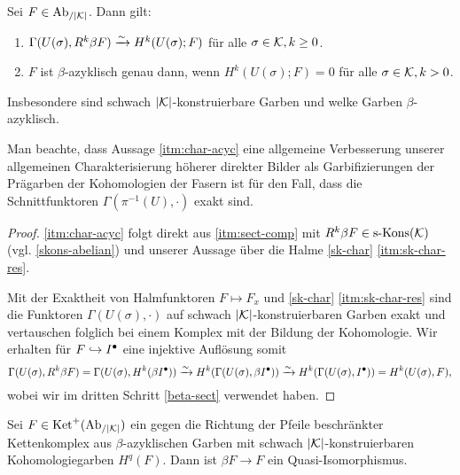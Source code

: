 \begin{prop}[\cite{KS}, 8.1.8] \label{sk-ist-azyk}
  Sei $F \in \operatorname{Ab}_{/|\mathcal{K}|}$. Dann gilt:
  \begin{enumerate}[label=(\roman*)]
  \item \label{itm:sect-comp} $\Gamma(U(\sigma), R^k\beta F) \xrightarrow{\sim}
    H^k(U(\sigma); F)$ für alle $\sigma \in \mathcal{K}, k \geq 0$.
  \item \label{itm:char-acyc} $F$ ist $\beta$-azyklisch genau dann,
    wenn $H^k(U(\sigma); F) = 0$ für alle $\sigma \in \mathcal{K}, k > 0$.
  \end{enumerate}
  Insbesondere sind schwach $|\mathcal{K}|$-konstruierbare Garben und welke
  Garben $\beta$-azyklisch.
\end{prop}
\begin{bem}
  Man beachte, dass Aussage \ref{itm:char-acyc} eine allgemeine
  Verbesserung unserer allgemeinen Charakterisierung höherer direkter
  Bilder als Garbifizierungen der Prägarben der Kohomologien der
  Fasern ist für den Fall, dass die Schnittfunktoren
  $\Gamma(\pi^{-1}(U), \cdot)$ exakt sind.
\end{bem}
\begin{proof}
  \ref{itm:char-acyc} folgt direkt aus \ref{itm:sect-comp} mit
  $R^k\beta F \in \operatorname{s-Kons}(\mathcal{K})$ (vgl. \ref{skons-abelian}) und unserer
  Aussage über die Halme \ref{sk-char} \ref{itm:sk-char-res}.
  
  Mit der Exaktheit von Halmfunktoren $F \mapsto F_x$ und
  \ref{sk-char} \ref{itm:sk-char-res} sind die Funktoren
  $\Gamma(U(\sigma), \cdot)$ auf schwach $|\mathcal{K}|$-konstruierbaren Garben
  exakt und vertauschen folglich bei einem Komplex mit der Bildung der
  Kohomologie. Wir erhalten für $F \hookrightarrow I^{\bullet}$ eine injektive Auflösung
  somit
  \[ \Gamma(U(\sigma), R^k\beta F)
  = \Gamma(U(\sigma), H^k(\beta I^{\bullet}))
  \xrightarrow{\sim} H^k(\Gamma(U(\sigma), \beta I^{\bullet}))
  \xrightarrow{\sim} H^k(\Gamma(U(\sigma), I^{\bullet}))
  = H^k(U(\sigma), F), \]
  wobei wir im dritten Schritt \ref{beta-sect} verwendet haben.
\end{proof}


\begin{prop}
  Sei $F \in \operatorname{Ket}^+(\operatorname{Ab}_{/|\mathcal{K}|})$ ein gegen die Richtung der Pfeile
  beschränkter Kettenkomplex aus $\beta$-azy\-klischen Garben mit
  schwach $|\mathcal{K}|$-kon\-stru\-ier\-bar\-en Kohomologiegarben $H^q(F)$. Dann
  ist $\beta F \to F$ ein Quasi-Iso\-mor\-phis\-mus.
\end{prop}

